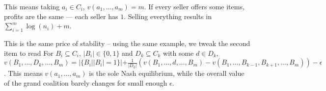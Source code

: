 {This means taking $a_{i}\in C_{i}$, $v(a_{1},\ldots,a_{m})=m$. If every seller offers some items, profits are the same --- each seller has $1$. Selling everything results in $\sum_{i=1}^{m}\log(n_{i})+m$.

This is the same price of stability -- using the same example, we tweak the second item to read For $B_{i}\subseteq C_{i}$, $|B_{i}|\in \{0,1\}$ and $D_{k}\subseteq C_{k}$ with some $d\in D_{k}$, $v(B_{1},\ldots,D_{k},\ldots,B_{m})=|\{B_{i} | |B_{i}|=1\}|+\frac{1}{|D_{k}|}(v(B_{1},\ldots,d,\ldots,B_{m})-v(B_{1},\ldots,B_{k-1},B_{k+1},\ldots,B_{m}))-\epsilon$. This means $v(a_{1},\ldots,a_{m})$ is the sole Nash equilibrium, while the overall value of the grand coalition barely changes for small enough $\epsilon$.
}

